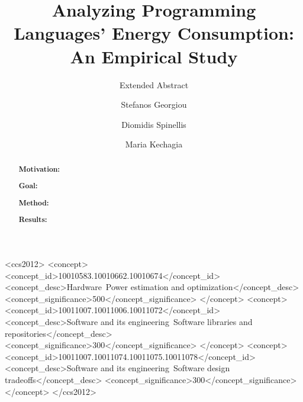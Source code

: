 \documentclass[sigconf]{acmart}
\begin{document}
\title{Analyzing Programming Languages' Energy Consumption: An Empirical Study}
\subtitle{Extended Abstract}


\author{Stefanos Georgiou}

\author{Diomidis Spinellis}

\author{Maria Kechagia}

\renewcommand{\shortauthors}{S. Georgiou et al.}


\begin{abstract}
\noindent \textbf{Motivation:}

\noindent \textbf{Goal:}

\noindent \textbf{Method:}

\noindent \textbf{Results:}

\end{abstract}

%
%
\begin{CCSXML}
	<ccs2012>
	<concept>
	<concept_id>10010583.10010662.10010674</concept_id>
	<concept_desc>Hardware~Power estimation and optimization</concept_desc>
	<concept_significance>500</concept_significance>
	</concept>
	<concept>
	<concept_id>10011007.10011006.10011072</concept_id>
	<concept_desc>Software and its engineering~Software libraries and repositories</concept_desc>
	<concept_significance>300</concept_significance>
	</concept>
	<concept>
	<concept_id>10011007.10011074.10011075.10011078</concept_id>
	<concept_desc>Software and its engineering~Software design tradeoffs</concept_desc>
	<concept_significance>300</concept_significance>
	</concept>
	</ccs2012>
\end{CCSXML}
\end{document}
